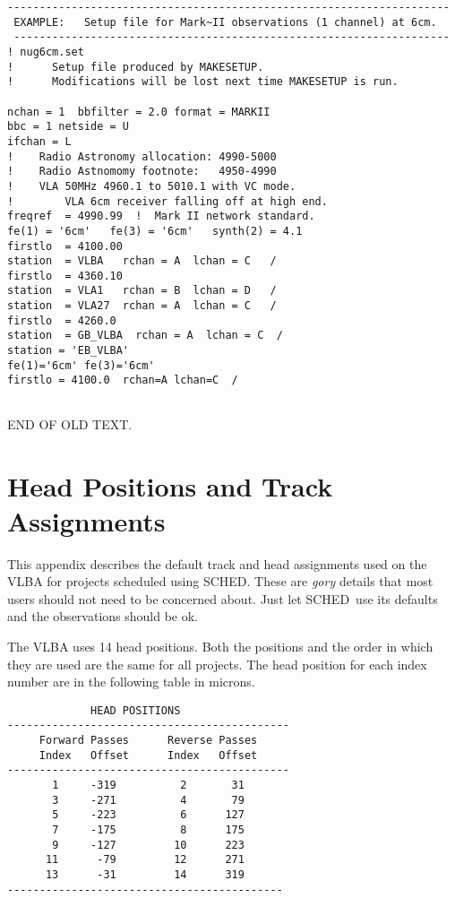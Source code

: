 \documentclass{report}
\newcommand{\sched}{{\sc SCHED}}
\newcommand{\schedb}{{\sc SCHED~}}
\begin{document}
\begin{verbatim}
---------------------------------------------------------------------
 EXAMPLE:   Setup file for Mark~II observations (1 channel) at 6cm.
 --------------------------------------------------------------------
! nug6cm.set
!      Setup file produced by MAKESETUP.
!      Modifications will be lost next time MAKESETUP is run.

nchan = 1  bbfilter = 2.0 format = MARKII
bbc = 1 netside = U
ifchan = L
!    Radio Astronomy allocation: 4990-5000
!    Radio Astnomomy footnote:   4950-4990
!    VLA 50MHz 4960.1 to 5010.1 with VC mode.
!        VLA 6cm receiver falling off at high end.
freqref  = 4990.99  !  Mark II network standard.
fe(1) = '6cm'   fe(3) = '6cm'   synth(2) = 4.1
firstlo  = 4100.00
station  = VLBA   rchan = A  lchan = C   /
firstlo  = 4360.10
station  = VLA1   rchan = B  lchan = D   /
station  = VLA27  rchan = A  lchan = C   /
firstlo  = 4260.0
station  = GB_VLBA  rchan = A  lchan = C  /
station = 'EB_VLBA'
fe(1)='6cm' fe(3)='6cm'
firstlo = 4100.0  rchan=A lchan=C  /


\end{verbatim}
\newpage

END OF OLD TEXT.




\section{\label{APP:HEAD}Head Positions and Track Assignments}

This appendix describes the default track and head assignments used on
the VLBA for projects scheduled using \sched.  These are {\em gory}
details that most users should not need to be concerned about.  Just
let \schedb use its defaults and the observations should be ok.

The VLBA uses 14 head positions.  Both the positions and the order in
which they are used are the same for all projects.
The head position for each index number are in the following
table in microns.

\begin{verbatim}
             HEAD POSITIONS
--------------------------------------------
     Forward Passes      Reverse Passes
     Index   Offset      Index   Offset
--------------------------------------------
       1     -319          2       31
       3     -271          4       79
       5     -223          6      127
       7     -175          8      175
       9     -127         10      223
      11      -79         12      271
      13      -31         14      319
-------------------------------------------
\end{verbatim}
\end{document}
